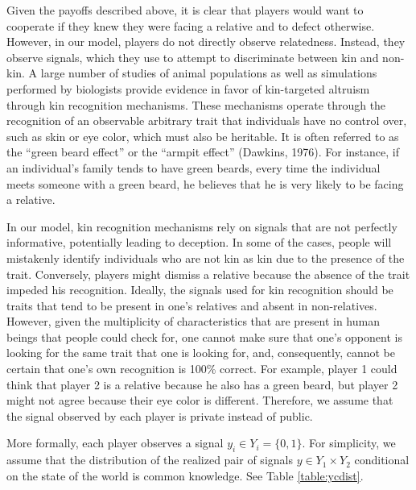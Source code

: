 \documentclass[12pt]{article}
\begin{document}
Given the payoffs described above, it is clear that players would want to cooperate if they knew they were facing a relative and to defect otherwise. However, in our model, players do not directly observe relatedness. Instead, they observe signals, which they use to attempt to discriminate between kin and non-kin. A large number of studies of animal populations as well as simulations performed by biologists provide evidence in favor of kin-targeted altruism through kin recognition mechanisms. These mechanisms operate through the recognition of an observable arbitrary trait that individuals have no control over, such as skin or eye color, which must also be heritable. It is often referred to as the ``green beard effect'' or the ``armpit effect'' (Dawkins, 1976). For instance, if an individual's family tends to have green beards, every time the individual meets someone with a green beard, he believes that he is very likely to be facing a relative.

In our model, kin recognition mechanisms rely on signals that are not perfectly informative, potentially leading to deception. In some of the cases, people will mistakenly identify  individuals who are not kin as kin due to the presence of the trait. Conversely, players might dismiss a relative because the absence of the trait impeded his recognition. Ideally, the signals used for kin recognition should be traits that tend to be present in one's relatives and absent in non-relatives. However, given the multiplicity of characteristics that are present in human beings that people could check for, one cannot make sure that one's opponent is looking for the same trait that one is looking for, and, consequently, cannot be certain that one's own recognition is 100\% correct. For example, player 1 could think that player 2 is a relative because he also has a green beard, but  player 2 might not agree because their eye color is different. Therefore, we assume that the signal observed by each player is private instead of public. 



More formally, each player observes a signal $y_{i} \in Y_{i}=\{0,1\}$. For simplicity, we assume that the distribution of the realized pair of signals $y\in Y_{1}\times Y_{2}$ conditional on the state of the world is common knowledge. See Table \ref{table:ycdist}.
\end{document}
